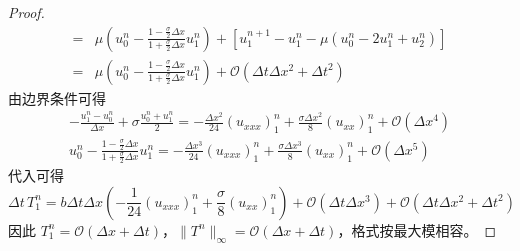 \begin{proof}
\begin{align*}
        ={}                    & \mu\left( u_{0}^n -  \frac{1-\frac{\sigma}2 \Delta x}{1 + \frac{\sigma}2 \Delta x} u_1^n \right)
        + \left[
        u_1^{n+1} - u_1^n - \mu(u_{0}^n - 2 u_1^n + u_2^n)
        \right]                                                                                                                            \\
        ={}                    & \mu\left( u_{0}^n -  \frac{1-\frac{\sigma}2 \Delta x}{1 + \frac{\sigma}2 \Delta x} u_1^n \right)
        + \mathcal{O}( \Delta t \Delta x^2 + \Delta t^2)
    \end{align*}
    由边界条件可得
    \begin{gather*}
        - \frac{u_1^n - u_{0}^n}{\Delta x} + \sigma \frac{u_0^n + u_1^n}2 = -\frac{\Delta x^2}{24} (u_{xxx})_1^n + \frac{\sigma \Delta x^2}8 (u_{xx})_1^n + \mathcal{O}(\Delta x^4) \\
        u_{0}^n -  \frac{1-\frac{\sigma}2 \Delta x}{1 + \frac{\sigma}2 \Delta x} u_1^n = -\frac{\Delta x^3}{24} (u_{xxx})_1^n + \frac{\sigma \Delta x^3}8 (u_{xx})_1^n + \mathcal{O}(\Delta x^5)
    \end{gather*}
    代入可得
    \[
        \Delta t\, T_1^{n} ={} b \Delta t \Delta x \left( -\frac1{24} (u_{xxx})_1^n + \frac{\sigma}8 (u_{xx})_1^n \right)
        + \mathcal{O}(\Delta t\Delta x^3) + \mathcal{O}( \Delta t \Delta x^2 + \Delta t^2)
    \]
    因此 $T_1^n = \mathcal{O}(\Delta x + \Delta t)$，$\|T^n\|_{\infty} = \mathcal{O}(\Delta x + \Delta t)$，格式按最大模相容。
\end{proof}


